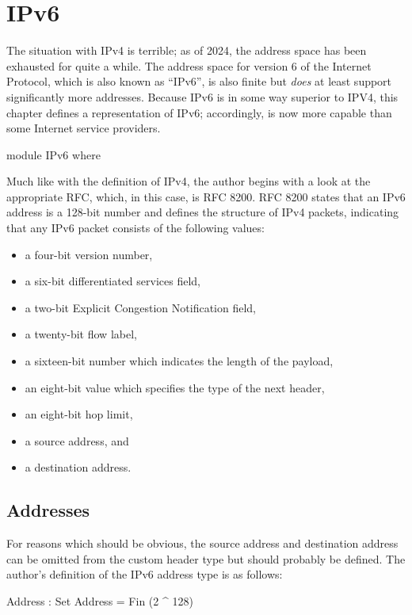 \documentclass{report}
\begin{document}
\chapter{IPv6}
The situation with IPv4 is terrible; as of 2024, the address space has been exhausted for quite a while.  The address space for version 6 of the Internet Protocol, which is also known as ``IPv6'', is also finite but \emph{does} at least support significantly more addresses.  Because IPv6 is in some way superior to IPV4, this chapter defines a representation of IPv6; accordingly,  is now more capable than some Internet service providers.

\begin{code}
module IPv6 where
\end{code}

Much like with the definition of IPv4, the author begins with a look at the appropriate RFC, which, in this case, is RFC 8200.  RFC 8200 states that an IPv6 address is a 128-bit number and defines the structure of IPv4 packets, indicating that any IPv6 packet consists of the following values:

\begin{itemize}
  \item a four-bit version number,
  \item a six-bit differentiated services field,
  \item a two-bit Explicit Congestion Notification field,
  \item a twenty-bit flow label,
  \item a sixteen-bit number which indicates the length of the payload,
  \item an eight-bit value which specifies the type of the next header,
  \item an eight-bit hop limit,
  \item a source address, and
  \item a destination address.
\end{itemize}

\section{Addresses}
For reasons which should be obvious, the source address and destination address can be omitted from the custom header type but should probably be defined.  The author's definition of the IPv6 address type is as follows:

\begin{code}
  Address : Set
  Address = Fin (2 ^ 128)
\end{code}
\end{document}
